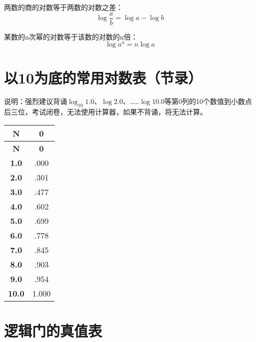 两数的商的对数等于两数的对数之差：
$$\log\frac{a}{b}=\log a-\log b$$

某数的n次幂的对数等于该数的对数的n倍：
$$\log a^n =n\log a$$

\newpage


\section{以10为底的常用对数表（节录）}

说明：强烈建议背诵$\log_{10} 1.0$、$\log 2.0$、……$\log 10.0$等第0列的10个数值到小数点后三位，考试闭卷，无法使用计算器，如果不背诵，将无法计算。

\begin{longtable}[c]{|c|c|}
    \hline
    \textbf{N} & \textbf{0} \\
    \hline
    \endfirsthead
    \hline
    \textbf{N} & \textbf{0} \\
    \endhead
    \textbf{1.0} & .000 \\ \hline
    \textbf{2.0} & .301 \\ \hline
    \textbf{3.0} & .477 \\ \hline
    \textbf{4.0} & .602 \\ \hline
    \textbf{5.0} & .699 \\ \hline
    \textbf{6.0} & .778 \\ \hline
    \textbf{7.0} & .845 \\ \hline
    \textbf{8.0} & .903 \\ \hline
    \textbf{9.0} & .954 \\ \hline
    \textbf{10.0} & 1.000 \\ \hline
\end{longtable}

\newpage

\section{逻辑门的真值表}


